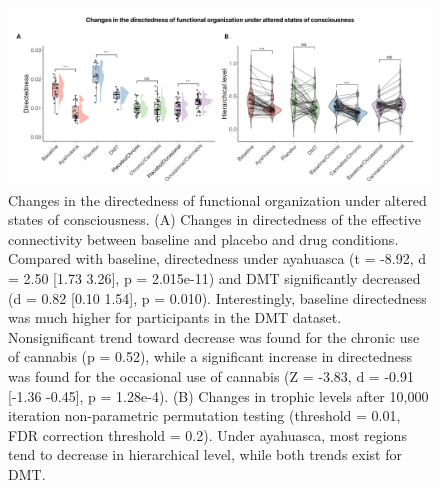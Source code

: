 \begin{figure}[h]
    \centering
    \includegraphics[width=\textwidth]{images/Figure 3_ Trophic coherence.png}
    \caption[Changes in directedness of hierarchical organization under altered state s of consciousness]{Changes in the directedness of functional organization under altered
states of consciousness. (A) Changes in directedness of the
effective connectivity between baseline and placebo and drug conditions.
Compared with baseline, directedness under ayahuasca (t = -8.92, d = 2.50 [1.73 3.26], p = 2.015e-11) and DMT significantly
decreased (d = 0.82 [0.10 1.54], p = 0.010). Interestingly, baseline directedness was much higher for participants in the DMT dataset. Nonsignificant trend
toward decrease was found for the chronic use of cannabis (p = 0.52), while a
significant increase in directedness was found for the occasional use of
cannabis (Z = -3.83, d = -0.91 [-1.36 -0.45], p = 1.28e-4). (B) Changes in trophic levels
after 10,000 iteration non-parametric permutation testing (threshold =
0.01, FDR correction threshold = 0.2). Under ayahuasca, most regions tend to decrease in hierarchical level, while both trends exist for DMT.}
    \label{fig:TC}
\end{figure}

